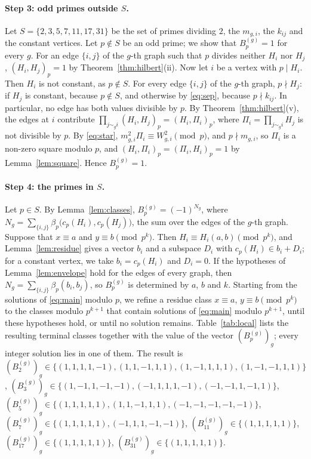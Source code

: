 \documentclass[11pt]{article}
\begin{document}
\paragraph{Step 3: odd primes outside $S$.} Let $S=\{2,3,5,7,11,17,31\}$ be the set of primes dividing $2$, the $m_{g,i}$, the $k_{ij}$ and the constant vertices. Let $p\notin S$ be an odd prime; we show that $B^{(g)}_p=1$ for every $g$. For an edge $\{i,j\}$ of the $g$-th graph such that $p$ divides neither $H_i$ nor $H_j$, $(H_i,H_j)_p=1$ by Theorem~\ref{thm:hilbert}(ii). Now let $i$ be a vertex with $p\mid H_i$. Then $H_i$ is not constant, as $p\notin S$. For every edge $\{i,j\}$ of the $g$-th graph, $p\nmid H_j$: if $H_j$ is constant, because $p\notin S$, and otherwise by \eqref{eq:sep}, because $p\nmid k_{ij}$. In particular, no edge has both values divisible by $p$. By Theorem~\ref{thm:hilbert}(v), the edges at $i$ contribute $\prod_{j\sim_g i}(H_i,H_j)_p=(H_i,\Pi_i)_p$, where $\Pi_i=\prod_{j\sim_g i}H_j$ is not divisible by $p$. By \eqref{eq:star}, $m_{g,i}^2\Pi_i\equiv W_{g,i}^2\pmod p$, and $p\nmid m_{g,i}$, so $\Pi_i$ is a non-zero square modulo $p$, and $(H_i,\Pi_i)_p=(\Pi_i,H_i)_p=1$ by Lemma~\ref{lem:square}. Hence $B^{(g)}_p=1$.

\paragraph{Step 4: the primes in $S$.} Let $p\in S$. By Lemma~\ref{lem:classes}, $B^{(g)}_p=(-1)^{N_g}$, where $N_g=\sum_{\{i,j\}}\beta_p\bigl(c_p(H_i),c_p(H_j)\bigr)$, the sum over the edges of the $g$-th graph. Suppose that $x\equiv a$ and $y\equiv b\pmod{p^k}$. Then $H_i\equiv H_i(a,b)\pmod{p^k}$, and Lemma~\ref{lem:residue} gives a vector $b_i$ and a subspace $D_i$ with $c_p(H_i)\in b_i+D_i$; for a constant vertex, we take $b_i=c_p(H_i)$ and $D_i=0$. If the hypotheses of Lemma~\ref{lem:envelope} hold for the edges of every graph, then $N_g=\sum_{\{i,j\}}\beta_p(b_i,b_j)$, so $B^{(g)}_p$ is determined by $a$, $b$ and $k$. Starting from the solutions of \eqref{eq:main} modulo $p$, we refine a residue class $x\equiv a$, $y\equiv b\pmod{p^k}$ to the classes modulo $p^{k+1}$ that contain solutions of \eqref{eq:main} modulo $p^{k+1}$, until these hypotheses hold, or until no solution remains. Table~\ref{tab:local} lists the resulting terminal classes together with the value of the vector $(B^{(g)}_p)_g$; every integer solution lies in one of them. The result is $(B^{(g)}_{2})_g\in\{(1,1,1,1,-1),\allowbreak (1,1,-1,1,1),\allowbreak (1,-1,1,1,1),\allowbreak (1,-1,-1,1,1)\}$, $(B^{(g)}_{3})_g\in\{(1,-1,1,-1,-1),\allowbreak (-1,1,1,1,-1),\allowbreak (-1,-1,1,-1,1)\}$, $(B^{(g)}_{5})_g\in\{(1,1,1,1,1),\allowbreak (1,1,-1,1,1),\allowbreak (-1,-1,-1,-1,-1)\}$, $(B^{(g)}_{7})_g\in\{(1,1,1,1,1),\allowbreak (-1,1,1,-1,-1)\}$, $(B^{(g)}_{11})_g\in\{(1,1,1,1,1)\}$, $(B^{(g)}_{17})_g\in\{(1,1,1,1,1)\}$, $(B^{(g)}_{31})_g\in\{(1,1,1,1,1)\}$.
\end{document}
